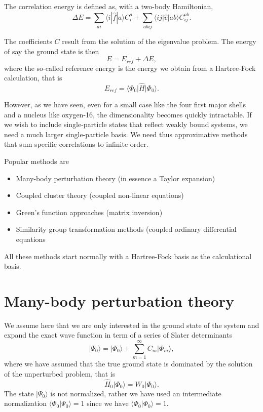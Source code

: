 \noindent
The correlation energy is defined as, with a two-body Hamiltonian,  
\[
\Delta E=\sum_{ai}\langle i| \hat{f}|a \rangle C_{i}^{a}+
\sum_{abij}\langle ij | \hat{v}| ab \rangle C_{ij}^{ab}.
\]

The coefficients $C$ result from the solution of the eigenvalue problem. 
The energy of say the ground state is then
\[
E=E_{ref}+\Delta E,
\]
where the so-called reference energy is the energy we obtain from a Hartree-Fock calculation, that is
\[
E_{ref}=\langle \Phi_0 \vert \hat{H} \vert \Phi_0 \rangle.
\]

However, as we have seen, even for a small case like the four first major shells and a nucleus like oxygen-16, the dimensionality becomes quickly intractable. If we wish to include single-particle states that reflect weakly bound systems, we need a much larger single-particle basis. We need thus approximative methods that sum specific correlations to infinite order. 

Popular methods are
\begin{itemize}
\item Many-body perturbation theory (in essence a Taylor expansion)

\item Coupled cluster theory (coupled non-linear equations)

\item Green's function approaches (matrix inversion)

\item Similarity group transformation methods (coupled ordinary differential equations
\end{itemize}

All these methods start normally with a Hartree-Fock basis as the calculational basis. 




\section{Many-body perturbation theory}

We assume here that we are only interested in the ground state of the system and 
expand the exact wave function in term of a series of Slater determinants
\[
\vert \Psi_0\rangle = \vert \Phi_0\rangle + \sum_{m=1}^{\infty}C_m\vert \Phi_m\rangle,
\]
where we have assumed that the true ground state is dominated by the 
solution of the unperturbed problem, that is
\[
\hat{H}_0\vert \Phi_0\rangle= W_0\vert \Phi_0\rangle.
\]
The state $\vert \Psi_0\rangle$ is not normalized, rather we have used an intermediate 
normalization $\langle \Phi_0 \vert \Psi_0\rangle=1$ since we have $\langle \Phi_0\vert \Phi_0\rangle=1$. 



